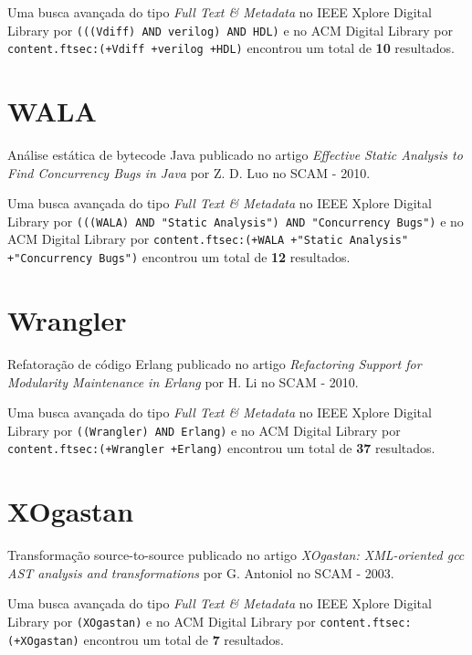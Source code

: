 Uma busca avançada do tipo {\it Full Text \& Metadata} no IEEE Xplore Digital Library por
\texttt{(((Vdiff) AND verilog) AND HDL)}
e no ACM Digital Library por
\texttt{content.ftsec:(+Vdiff +verilog +HDL)}
encontrou um total de
{\bf 10}
resultados.

\section{WALA}

Análise estática de bytecode Java
publicado no artigo
{\it Effective Static Analysis to Find Concurrency Bugs in Java}
por
Z. D. Luo
no
SCAM
-
2010.


Uma busca avançada do tipo {\it Full Text \& Metadata} no IEEE Xplore Digital Library por
\texttt{(((WALA) AND "Static Analysis") AND "Concurrency Bugs")}
e no ACM Digital Library por
\texttt{content.ftsec:(+WALA +"Static Analysis" +"Concurrency Bugs")}
encontrou um total de
{\bf 12}
resultados.

\section{Wrangler}

Refatoração de código Erlang
publicado no artigo
{\it Refactoring Support for Modularity Maintenance in Erlang}
por
H. Li
no
SCAM
-
2010.


Uma busca avançada do tipo {\it Full Text \& Metadata} no IEEE Xplore Digital Library por
\texttt{((Wrangler) AND Erlang)}
e no ACM Digital Library por
\texttt{content.ftsec:(+Wrangler +Erlang)}
encontrou um total de
{\bf 37}
resultados.

\section{XOgastan}

Transformação source-to-source
publicado no artigo
{\it XOgastan: XML-oriented gcc AST analysis and transformations}
por
G. Antoniol
no
SCAM
-
2003.


Uma busca avançada do tipo {\it Full Text \& Metadata} no IEEE Xplore Digital Library por
\texttt{(XOgastan)}
e no ACM Digital Library por
\texttt{content.ftsec:(+XOgastan)}
encontrou um total de
{\bf 7}
resultados.


